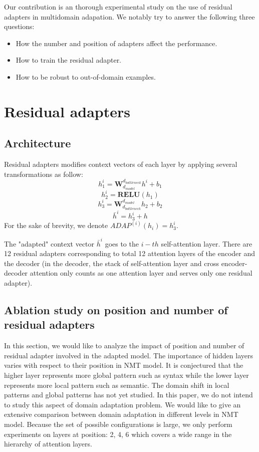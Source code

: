 \documentclass[11pt,a4paper]{article}
\newcommand{\fyTodo}[1]{\Todo[FY:]{\textcolor{orange}{#1}}}
\begin{document}
Our contribution is an thorough experimental study on the use of residual adapters in multidomain adapation. We notably try to answer the following three questions:
\begin{itemize}
\item How the number and position of adapters affect the performance.
\item How to train the residual adapter.
\item How to be robust to out-of-domain examples.
\end{itemize}
\fyTodo{One bit of a conclusion here}

\section{Residual adapters \label{sec:res}}

\subsection{Architecture \label{ssec:architecture}}
Residual adapters modifies context vectors of each layer by applying several transformations as follow:
$$ h^{i}_1 = \mathbf{W}_{d_{model}}^{d_{bottleneck}}h^{i} + b_{1}$$
$$ h^{i}_2 = \mathbf{RELU}(h_1)$$
$$ h^{i}_3 = \mathbf{W}_{d_{bottleneck}}^{d_{model}}h_2 + b_{2}$$
$$ \bar{h}^{i} = h^i_3 + h $$
For the sake of brevity, we denote $ADAP^{(i)}(h_i) = h^i_3$.

The "adapted" context vector $\bar{h}^i$ goes to the $i-th$ self-attention layer. There are 12 residual adapters corresponding to total 12 attention layers of the encoder and the decoder (in the decoder, the stack of self-attention layer and cross encoder-decoder attention only counts as one attention layer and serves only one residual adapter).
\subsection{Ablation study on position and number of residual adapters \label{ssec:ablatation}}
In this section, we would like to analyze the impact of position and number of residual adapter involved in the adapted model. The importance of hidden layers varies with respect to their position in NMT model. It is conjectured that the higher layer represents more global pattern such as syntax while the lower layer represents more local pattern such as semantic. The domain shift in local patterns and global patterns has not yet studied. In this paper, we do not intend to study this aspect of domain adaptation problem. We would like to give an extensive comparison between domain adaptation in different levels in NMT model. Because the set of possible configurations is large, we only perform experiments on layers at position: 2, 4, 6 which covers a wide range in the hierarchy of attention layers. 
\end{document}
